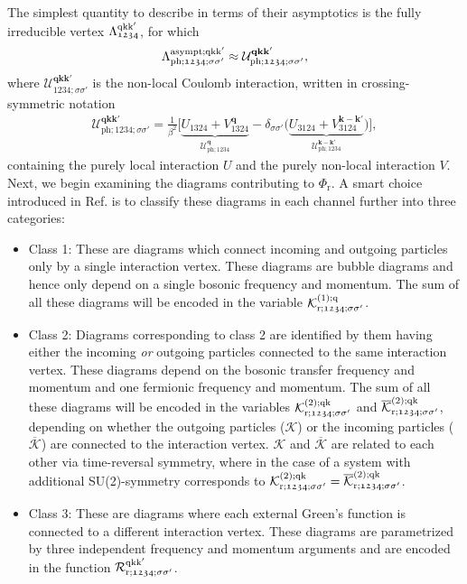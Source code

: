 \documentclass[../../main.tex]{subfiles}
\begin{document}
The simplest quantity to describe in terms of their asymptotics is the fully irreducible vertex $\Lambda^{\text{q}\text{k}\text{k}'}_{\mathfrak{1234}}$, for which
\begin{align}
	\Lambda^{\text{asympt};\text{q}\text{k}\text{k}'}_{\text{ph};\mathfrak{1234};\sigma\sigma'}\approx\mathcal{U}^{\textbf{qkk}'}_{\text{ph};\mathfrak{1234};\sigma\sigma'},
\end{align}
where $\mathcal{U}^{\textbf{qkk}'}_{\mathfrak{1234};\sigma\sigma'}$ is the non-local Coulomb interaction, written in crossing-symmetric notation
\begin{align}
	 \mathcal{U}^{\textbf{qkk}'}_{\text{ph};\mathfrak{1234};\sigma\sigma'}= \frac{1}{\beta^2}\Big [ \underbrace{U_{\mathfrak{1324}}+V^{\textbf{q}}_{\mathfrak{1324}}}_{\mathcal{U}^{\textbf{q}}_{\text{ph};\mathfrak{1234}}}-\delta_{\sigma\sigma'}\big (\underbrace{U_{\mathfrak{3124}}+V^{\textbf{k}-\textbf{k}'}_{\mathfrak{3124}}}_{\mathcal{U}^{\textbf{k}-\textbf{k}'}_{\text{ph};\mathfrak{1234}}}\big )\Big ],
\end{align}
containing the purely local interaction $U$ and the purely non-local interaction $V$. Next, we begin examining the diagrams contributing to $\Phi_{\text{r}}$. A smart choice introduced in Ref. \cite{high-freq asympt} is to classify these diagrams in each channel further into three categories:
\begin{itemize}
	\item Class 1: These are diagrams which connect incoming and outgoing particles only by a single interaction vertex. These diagrams are bubble diagrams and hence only depend on a single bosonic frequency and momentum. The sum of all these diagrams will be encoded in the variable $\mathcal{K}^{(1);\text{q}}_{\text{r};\mathfrak{1234};\sigma\sigma'}$.
	\item Class 2: Diagrams corresponding to class 2 are identified by them having either the incoming \textit{or} outgoing particles connected to the same interaction vertex. These diagrams depend on the bosonic transfer frequency and momentum and one fermionic frequency and momentum. The sum of all these diagrams will be encoded in the variables $\mathcal{K}^{(2);\text{q}\text{k}}_{\text{r};\mathfrak{1234};\sigma\sigma'}$ and $\overline{\mathcal{K}}^{(2);\text{q}\text{k}}_{\text{r};\mathfrak{1234};\sigma\sigma'}$, depending on whether the outgoing particles ($\mathcal{K}$) or the incoming particles ($\overline{\mathcal{K}}$) are connected to the interaction vertex. $\mathcal{K}$ and $\overline{\mathcal{K}}$ are related to each other via time-reversal symmetry, where in the case of a system with additional SU(2)-symmetry corresponds to \cite{rohringer thesis} $\mathcal{K}^{(2);\text{q}\text{k}}_{\text{r};\mathfrak{1234};\sigma\sigma'}=\overline{\mathcal{K}}^{(2);\text{q}\text{k}}_{\text{r};\mathfrak{1234};\sigma\sigma'}$.
	\item Class 3: These are diagrams where each external Green's function is connected to a different interaction vertex. These diagrams are parametrized by three independent frequency and momentum arguments and are encoded in the  function $\mathcal{R}^{\text{q}\text{k}\text{k}'}_{\text{r};\mathfrak{1234};\sigma\sigma'}$.
\end{itemize}
\end{document}
